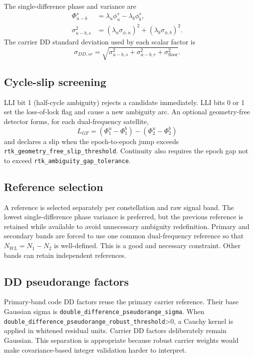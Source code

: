 \documentclass[11pt,a4paper]{article}
\newcommand{\code}[1]{\texttt{#1}}
\begin{document}
The single-difference phase and variance are
\begin{align}
\Phi_{u-b}^s &= \lambda_u\phi_u^s-\lambda_b\phi_b^s,\\
\sigma_{u-b,s}^2 &= (\lambda_u\sigma_{\phi,u})^2+
                    (\lambda_b\sigma_{\phi,b})^2.
\end{align}
The carrier DD standard deviation used by each scalar factor is
\begin{equation}
\sigma_{DD,sr}=\sqrt{\sigma_{u-b,s}^2+\sigma_{u-b,r}^2+
                           \sigma_{\mathrm{floor}}^2}.
\end{equation}

\subsection{Cycle-slip screening}

LLI bit 1 (half-cycle ambiguity) rejects a candidate immediately.  LLI bits 0
or 1 set the loss-of-lock flag and cause a new ambiguity arc.  An optional
geometry-free detector forms, for each dual-frequency satellite,
\begin{equation}
L_{GF}=(\Phi_1^u-\Phi_1^b)-(\Phi_2^u-\Phi_2^b)
\end{equation}
and declares a slip when the epoch-to-epoch jump exceeds
\code{rtk\_geometry\_free\_slip\_threshold}.  Continuity also requires the
epoch gap not to exceed \code{rtk\_ambiguity\_gap\_tolerance}.

\subsection{Reference selection}

A reference is selected separately per constellation and raw signal band.  The
lowest single-difference phase variance is preferred, but the previous reference
is retained while available to avoid unnecessary ambiguity redefinition.
Primary and secondary bands are forced to use one common dual-frequency
reference so that $N_{WL}=N_1-N_2$ is well-defined.  This is a good and necessary
constraint.  Other bands can retain independent references.

\subsection{DD pseudorange factors}

Primary-band code DD factors reuse the primary carrier reference.  Their base
Gaussian sigma is \code{double\_difference\_pseudorange\_sigma}.  When
\code{double\_difference\_pseudorange\_robust\_threshold}>0, a Cauchy kernel is
applied in whitened residual units.  Carrier DD factors deliberately remain
Gaussian.  This separation is appropriate because robust carrier weights would
make covariance-based integer validation harder to interpret.
\end{document}
